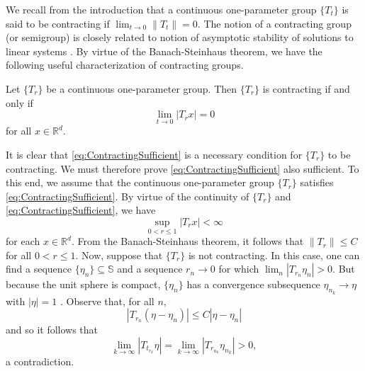 \documentclass[smallextended]{svjour3}
\theoremstyle{remark}
\renewenvironment{proof}[1][\proofname]{\renewcommand\xproofname{#1}\xproof}{\endxproof}
\begin{document}
\noindent We recall from the introduction that a continuous one-parameter group $\{T_t\}$ is said to be contracting if $\lim_{t\to 0}\|T_t\|=0$. The notion of a contracting group (or semigroup) is closely related to notion of asymptotic stability of solutions to linear systems \cite{braun_differential_1993}. By virtue of the Banach-Steinhaus theorem, we have the following useful characterization of contracting groups.
\begin{proposition}\label{prop:ContractingCharacterization}
Let $\{T_r\}$ be a continuous one-parameter group. Then $\{T_r\}$ is contracting if and only if
\begin{equation}\label{eq:ContractingSufficient}
\lim_{t\to 0}|T_rx|=0
\end{equation}
for all $x\in\mathbb{R}^d$.
\end{proposition}

\begin{proof}
It is clear that \eqref{eq:ContractingSufficient} is a necessary condition for $\{T_r\}$ to be contracting. We must therefore prove \eqref{eq:ContractingSufficient} also sufficient. To this end, we assume that the continuous one-parameter group $\{T_r\}$ satisfies \eqref{eq:ContractingSufficient}. By virtue of the continuity of $\{T_r\}$ and \eqref{eq:ContractingSufficient}, we have
\begin{equation*}
\sup_{0<r\leq 1}|T_r x|<\infty
 \end{equation*}
for each $x\in\mathbb{R}^d$. From the Banach-Steinhaus theorem, it follows that $\|T_r\|\leq C$ for all $0<r\leq 1$. Now, suppose that $\{T_r\}$ is not contracting. In this case, one can find a sequence $\{\eta_n\}\subseteq\mathbb{S}$ and a sequence $r_n\rightarrow 0$ for which $\lim_n|T_{r_n}\eta_n|>0$. But because the unit sphere is compact, $\{\eta_n\}$ has a convergence subsequence $\eta_{n_k}\rightarrow \eta$ with $|\eta|=1$ . Observe that, for all $n$,
 \begin{equation*}
 |T_{r_n}(\eta-\eta_n)|\leq C|\eta-\eta_n|
 \end{equation*}
 and so it follows that
 \begin{equation*}
 \lim_{k\rightarrow\infty}|T_{t_{r_k}}\eta|=\lim_{k\rightarrow\infty}|T_{r_{n_k}}\eta_{n_k}|>0,
 \end{equation*}
 a contradiction.
 \end{proof}
\end{document}
